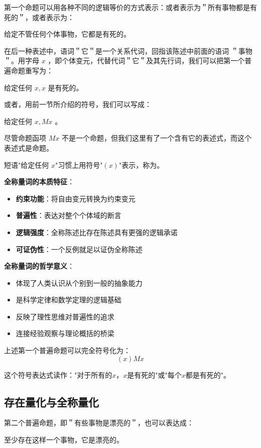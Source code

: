 第一个命题可以用各种不同的逻辑等价的方式表示：或者表示为＂所有事物都是有死的＂，或者表示为：

给定不管任何个体事物，它都是有死的。

在后一种表述中，语词＂它＂是一个关系代词，回指该陈述中前面的语词 ＂事物＂。用字母 $x$ ，即个体变元，代替代词＂它＂及其先行词，我们可以把第一个普遍命题重写为：

给定任何 $x, x$ 是有死的。

或者，用前一节所介绍的符号，我们可以写成：

给定任何 $x, M x$ 。

尽管命题函项 $M x$ 不是一个命题，但我们这里有了一个含有它的表述式，而这个表述式是命题。

\begin{theorembox}[title=全称量词的深入分析]
短语"给定任何 $x$"习惯上用符号"$(x)$"表示，称为。

\textbf{全称量词的本质特征}：
\begin{itemize}
\item \textbf{约束功能}：将自由变元转换为约束变元
\item \textbf{普遍性}：表达对整个个体域的断言
\item \textbf{逻辑强度}：全称陈述比存在陈述具有更强的逻辑承诺
\item \textbf{可证伪性}：一个反例就足以证伪全称陈述
\end{itemize}

\textbf{全称量词的哲学意义}：
\begin{itemize}
\item 体现了人类认识从个别到一般的抽象能力
\item 是科学定律和数学定理的逻辑基础
\item 反映了理性思维对普遍性的追求
\item 连接经验观察与理论概括的桥梁
\end{itemize}
\end{theorembox}

上述第一个普遍命题可以完全符号化为：
$$(x)Mx$$

这个符号表达式读作："对于所有的$x$，$x$是有死的"或"每个$x$都是有死的"。

\subsection{存在量化与全称量化}

第二个普遍命题，即＂有些事物是漂亮的＂，也可以表达成：

至少存在这样一个事物，它是漂亮的。

